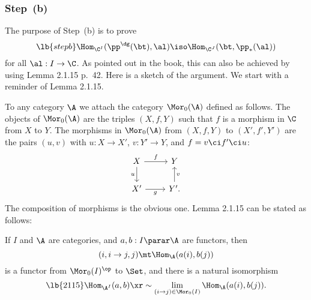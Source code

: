 \documentclass[12pt]{article}
\theoremstyle{remark}
\theoremstyle{definition}
\begin{document}
%

\subsubsection{Step~(b)}

The purpose of Step~(b) is to prove 
\begin{equation}\lb{stepb}
\Hom_{\C^I}(\pp^\dg(\bt),\al)\iso\Hom_{\C^J}(\bt,\pp_*(\al)) 
\end{equation} 
for all $\al:I\to\C$. As pointed out in the book, this can also be achieved by using Lemma 2.1.15 p.~42. Here is a sketch of the argument. We start with a reminder of Lemma 2.1.15. 

To any category $\A$ we attach the category $\Mor_0(\A)$ defined as follows. The objects of $\Mor_0(\A)$ are the triples $(X,f,Y)$ such that $f$ is a morphism in $\C$ from $X$ to $Y$. The morphisms in $\Mor_0(\A)$ from $(X,f,Y)$ to $(X',f',Y')$ are the pairs $(u,v)$ with $u:X\to X'$, $v:Y'\to Y$, and $f=v\ci f'\ci u$:
$$
\begin{tikzcd}
X\ar{d}[swap]{u}\ar{r}{f}&Y\\ 
X'\ar{r}[swap]{g}&Y'\ar{u}[swap]{v}.
\end{tikzcd}
$$ 
The composition of morphisms is the obvious one. Lemma 2.1.15 can be stated as follows: 

If $I$ and $\A$ are categories, and $a,b:I\parar\A$ are functors, then 
$$
(i,i\to j,j)\mt\Hom_\A(a(i),b(j))
$$ 
is a functor from $\Mor_0(I)^{\op}$ to $\Set$, and there is a natural isomorphism 
%
\begin{equation}\lb{2115} 
\Hom_{\A^I}(a,b)\xr\sim\lim_{(i\to j)\in\Mor_0(I)}\Hom_\A(a(i),b(j)).
\end{equation}
%
\end{document}
